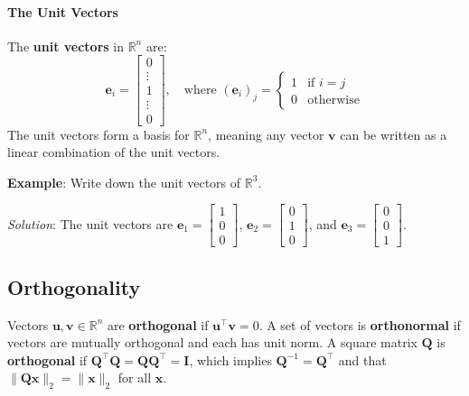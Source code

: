 \paragraph*{The Unit Vectors}
The \textbf{unit vectors} in $ \mathbb{R}^n $ are:
\begin{equation*}
    \mathbf{e}_i = \begin{bmatrix}0 \\ \vdots \\ 1 \\ \vdots \\ 0\end{bmatrix}, \quad \text{where } (\mathbf{e}_{i})_j = \begin{cases} 1 & \text{if } i = j \\ 0 & \text{otherwise} \end{cases}
\end{equation*}
The unit vectors form a basis for $ \mathbb{R}^n $, meaning any vector $ \mathbf{v} $ can be written as a linear combination of the unit vectors.
\begin{exampleBox}
    \textbf{Example}: Write down the unit vectors of $ \mathbb{R}^3 $.

    \emph{Solution}: The unit vectors are $ \mathbf{e}_1 = \begin{bmatrix}1 \\ 0 \\ 0\end{bmatrix} $, $ \mathbf{e}_2 = \begin{bmatrix}0 \\ 1 \\ 0\end{bmatrix} $, and $ \mathbf{e}_3 = \begin{bmatrix}0 \\ 0 \\ 1\end{bmatrix} $.
\end{exampleBox}

\subsection{Orthogonality}
Vectors $ \mathbf{u}, \mathbf{v} \in \mathbb{R}^n $ are \textbf{orthogonal} if $ \mathbf{u}^\top \mathbf{v} = 0 $. A set of vectors is \textbf{orthonormal} if vectors are mutually orthogonal and each has unit norm. A square matrix $ \mathbf{Q} $ is \textbf{orthogonal} if $ \mathbf{Q}^\top \mathbf{Q} = \mathbf{Q}\mathbf{Q}^\top = \mathbf{I} $, which implies $ \mathbf{Q}^{-1} = \mathbf{Q}^\top $ and that $ \|\mathbf{Q}\mathbf{x}\|_2 = \|\mathbf{x}\|_2 $ for all $ \mathbf{x} $.

